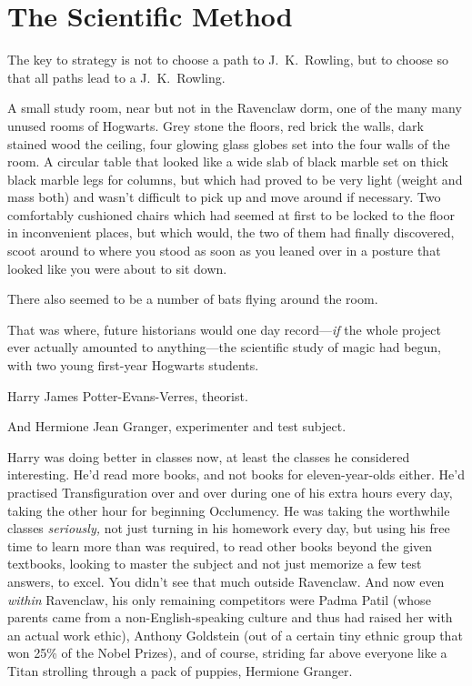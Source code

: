 \chapter{The Scientific Method}

\begin{chapterOpeningAuthorNote}
The key to strategy is not to choose a path to J.~K.~Rowling, but to choose so that all paths lead to a J.~K.~Rowling.
\end{chapterOpeningAuthorNote}

\lettrine{A}{} small study room, near but not in the Ravenclaw dorm, one of the many many unused rooms of Hogwarts. Grey stone the floors, red brick the walls, dark stained wood the ceiling, four glowing glass globes set into the four walls of the room. A circular table that looked like a wide slab of black marble set on thick black marble legs for columns, but which had proved to be very light (weight and mass both) and wasn’t difficult to pick up and move around if necessary. Two comfortably cushioned chairs which had seemed at first to be locked to the floor in inconvenient places, but which would, the two of them had finally discovered, scoot around to where you stood as soon as you leaned over in a posture that looked like you were about to sit down.

There also seemed to be a number of bats flying around the room.

That was where, future historians would one day record—\emph{if} the whole project ever actually amounted to anything—the scientific study of magic had begun, with two young first-year Hogwarts students.

Harry James Potter-Evans-Verres, theorist.

And Hermione Jean Granger, experimenter and test subject.

Harry was doing better in classes now, at least the classes he considered interesting. He’d read more books, and not books for eleven-year-olds either. He’d practised Transfiguration over and over during one of his extra hours every day, taking the other hour for beginning Occlumency. He was taking the worthwhile classes \emph{seriously,} not just turning in his homework every day, but using his free time to learn more than was required, to read other books beyond the given textbooks, looking to master the subject and not just memorize a few test answers, to excel. You didn’t see that much outside Ravenclaw. And now even \emph{within} Ravenclaw, his only remaining competitors were Padma Patil (whose parents came from a non-English-speaking culture and thus had raised her with an actual work ethic), Anthony Goldstein (out of a certain tiny ethnic group that won 25\% of the Nobel Prizes), and of course, striding far above everyone like a Titan strolling through a pack of puppies, Hermione Granger.

